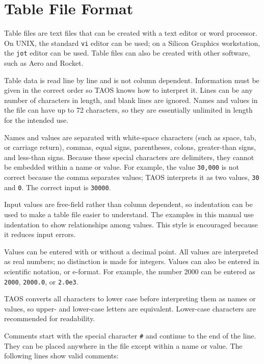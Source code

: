 \section{Table File Format}\label{sec:table-file-format}

Table files are text files that can be created with a text editor or word processor.
On UNIX, the standard \texttt{vi} editor can be used; on a Silicon Graphics
workstation, the \texttt{jot} editor can be used. Table files can also be created with
other software, such as Aero and Rocket.


Table data is read line by line and is not column dependent. Information must be
given in the correct order so TAOS knows how to interpret it. Lines can be any
number of characters in length, and blank lines are ignored. Names and values in the
file can have up to 72 characters, so they are essentially unlimited in length for the
intended use.

Names and values are separated with white-space characters (such as space, tab, or
carriage return), commas, equal signs, parentheses, colons, greater-than signs, and
less-than signs. Because these special characters are delimiters, they cannot be
embedded within a name or value. For example, the value \texttt{30,000} is not
correct because the comma separates values; TAOS interprets it as two values,
\texttt{30} and \texttt{0}. The correct input is \texttt{30000}.

Input values are free-field rather than column dependent, so indentation can be used
to make a table file easier to understand. The examples in this manual use
indentation to show relationships among values. This style is encouraged because it
reduces input errors.

Values can be entered with or without a decimal point. All values are interpreted as
real numbers; no distinction is made for integers. Values can also be entered in
scientific notation, or e-format. For example, the number 2000 can be entered as
\texttt{2000}, \texttt{2000.0}, or \texttt{2.0e3}.

TAOS converts all characters to lower case before interpreting them as names or
values, so upper- and lower-case letters are equivalent. Lower-case characters are
recommended for readability.


Comments start with the special character \texttt{\#} and continue to the end of the
line. They can be placed anywhere in the file except within a name or value. The
following lines show valid comments:

